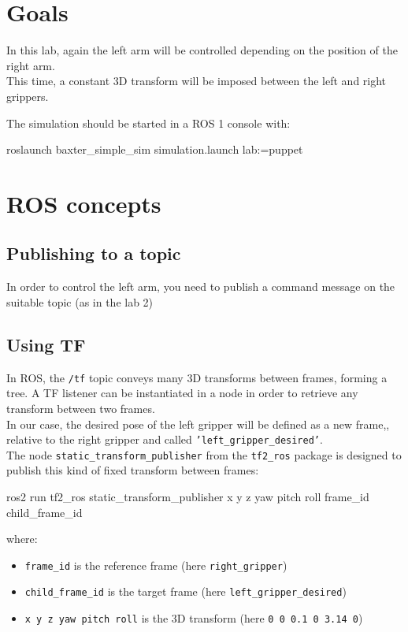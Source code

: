 \documentclass{ecnreport}
\author{O. Kermorgant}
\begin{document}


\section{Goals}

In this lab, again the left arm will be controlled depending on the position of the right arm.\\
This time, a constant 3D transform will be imposed between the left and right grippers. 

The simulation should be started in a ROS 1 console with:
\begin{bashcodelarge}
 roslaunch baxter_simple_sim simulation.launch lab:=puppet
\end{bashcodelarge}

\section{ROS concepts}

\subsection{Publishing to a topic}

In order to control the left arm, you need to publish a command message on the suitable topic (as in the lab 2)

\subsection{Using TF}

In ROS, the \texttt{/tf} topic conveys many 3D transforms between frames, forming a tree. A TF listener can be instantiated in a node in order to retrieve any transform between two frames. \\
In our case, the desired pose of the left gripper will be defined as a new frame,,  relative to the right gripper and called \texttt{'left\_gripper\_desired'}.\\
The node \texttt{static\_transform\_publisher} from the \texttt{tf2\_ros} package is designed to publish this kind of fixed transform between frames:
\begin{bashcodelarge}
 ros2 run tf2_ros static_transform_publisher x y z yaw pitch roll frame_id child_frame_id
\end{bashcodelarge}where:
\begin{itemize}
\item \texttt{frame\_id} is the reference frame (here \texttt{right\_gripper})
\item \texttt{child\_frame\_id} is the target frame (here \texttt{left\_gripper\_desired})
 \item \texttt{x y z yaw pitch roll} is the 3D transform (here \texttt{0 0 0.1 0 3.14 0})
\end{itemize}
\end{document}
